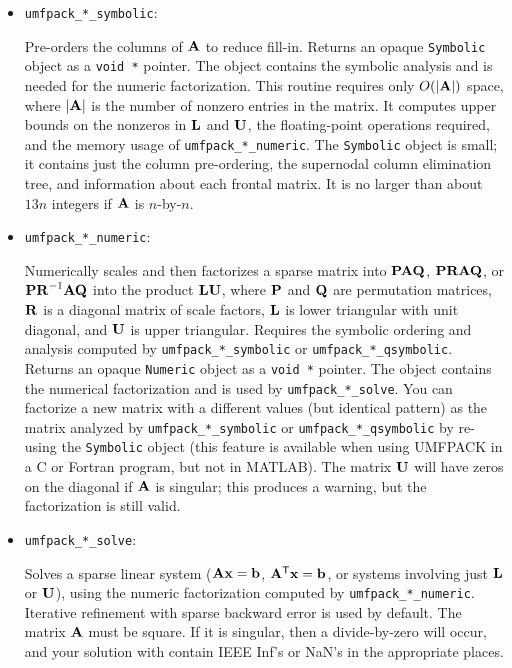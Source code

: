 \documentclass[11pt]{article}
\newcommand{\m}[1]{{\bf{#1}}}       %
\newcommand{\tr}{^{\sf T}}          %
\begin{document}
\begin{itemize}
\item {\tt umfpack\_*\_symbolic}:

    Pre-orders the columns of $\m{A}$ to reduce fill-in.
    Returns an opaque {\tt Symbolic} object as a {\tt void *}
    pointer.  The object contains the symbolic analysis and is needed for the
    numeric factorization.  This routine requires only $O(|\m{A}|)$ space,
    where $|\m{A}|$ is the number of nonzero entries in the matrix.  It computes
    upper bounds on the nonzeros in $\m{L}$ and $\m{U}$, the floating-point
    operations required, and the memory usage of {\tt umfpack\_*\_numeric}.  The
    {\tt Symbolic} object is small; it contains just the column pre-ordering,
    the supernodal column elimination tree, and information about each frontal
    matrix. It is no larger than about $13n$ integers if $\m{A}$ is
    $n$-by-$n$.

\item {\tt umfpack\_*\_numeric}:

    Numerically scales and then factorizes a sparse matrix into
    $\m{PAQ}$, $\m{PRAQ}$, or $\m{PR}^{-1}\m{AQ}$ into the product $\m{LU}$,
    where
    $\m{P}$ and $\m{Q}$ are permutation matrices, $\m{R}$ is a diagonal
    matrix of scale factors, $\m{L}$ is lower triangular with unit diagonal,
    and $\m{U}$ is upper triangular.  Requires the
    symbolic ordering and analysis computed by {\tt umfpack\_*\_symbolic}
    or {\tt umfpack\_*\_qsymbolic}.
    Returns an opaque {\tt Numeric} object as a
    {\tt void *} pointer.  The object contains the numerical factorization and
    is used by {\tt umfpack\_*\_solve}.  You can factorize a new matrix with a
    different values (but identical pattern) as the matrix analyzed by
    {\tt umfpack\_*\_symbolic} or {\tt umfpack\_*\_qsymbolic} by re-using the
    {\tt Symbolic} object (this feature is available when using UMFPACK in a
    C or Fortran program, but not in MATLAB).
    The matrix
    $\m{U}$ will have zeros on the diagonal if $\m{A}$ is singular; this
    produces a warning, but the factorization is still valid.

\item {\tt umfpack\_*\_solve}:

    Solves a sparse linear system ($\m{Ax}=\m{b}$, $\m{A}\tr\m{x}=\m{b}$, or
    systems involving just $\m{L}$ or $\m{U}$), using the numeric factorization
    computed by {\tt umfpack\_*\_numeric}.  Iterative refinement with sparse
    backward error \cite{ardd:89} is used by default.  The matrix $\m{A}$ must
    be square.  If it is singular, then a divide-by-zero will occur, and your
    solution with contain IEEE Inf's or NaN's in the appropriate places.


\end{itemize}
\end{document}
